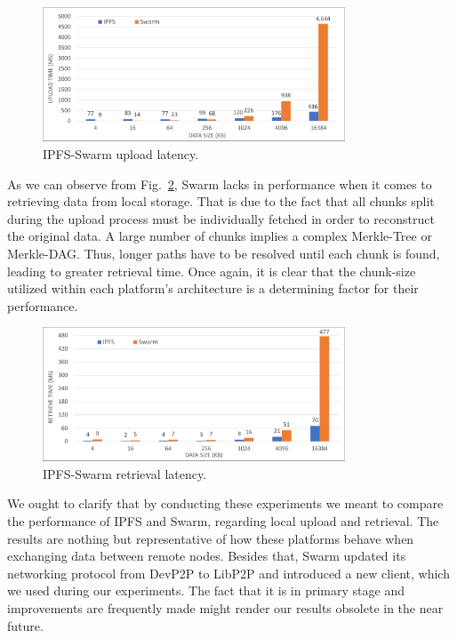 \begin{figure}[htbp]
\centerline{\includegraphics[width=9cm]{figs/ipfs_swarm_upload.pdf}}
\caption{IPFS-Swarm upload latency.}
\label{fig: ipfs_swarm_upload}
\end{figure}
\setlength{\belowcaptionskip}{-10pt}

As we can observe from Fig.~\ref{fig: ipfs_swarm_retrieve}, Swarm lacks in performance when it comes to retrieving data from local storage. That is due to the fact that all chunks split during the upload process must be individually fetched in order to reconstruct the original data. A large number of chunks implies a complex Merkle-Tree or Merkle-DAG. Thus, longer paths have to be resolved until each chunk is found, leading to greater retrieval time. Once again, it is clear that the chunk-size utilized within each platform’s architecture is a determining factor for their performance.

\begin{figure}[htbp]
\centerline{\includegraphics[width=9cm]{figs/ipfs_swarm_retrieve.pdf}}
\caption{IPFS-Swarm retrieval latency.}
\label{fig: ipfs_swarm_retrieve}
\end{figure}
\setlength{\belowcaptionskip}{-10pt}

We ought to clarify that by conducting these experiments we meant to compare the performance of IPFS and Swarm, regarding local upload and retrieval. The results are nothing but representative of how these platforms behave when exchanging data between remote nodes. Besides that, Swarm updated its networking protocol from DevP2P to LibP2P and introduced a new client, which we used during our experiments. The fact that it is in primary stage and improvements are frequently made might render our results obsolete in the near future.
